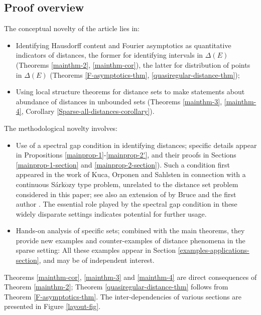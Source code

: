 \documentclass[a4paper,11pt]{amsart}
\numberwithin{equation}{section}
\begin{document}
\subsection{Proof overview} 
The conceptual novelty of the article lies in: 
\begin{itemize}
\vskip0.05in
\item Identifying Hausdorff content and Fourier asymptotics as quantitative indicators of distances, the former for identifying intervals in $\Delta(E)$ (Theorems \ref{mainthm-2}, \ref{mainthm-cor}), the latter for distribution of points in $\Delta(E)$ (Theorems \ref{F-asymptotics-thm}, \ref{quasiregular-distance-thm});   
\vskip0.05in
\item Using local structure theorems for distance sets to make statements about abundance of distances in unbounded sets (Theorems \ref{mainthm-3}, \ref{mainthm-4}, Corollary \ref{Sparse-all-distances-corollary}). 
  \end{itemize} 
The methodological novelty involves: 
\vskip0.05in 
\begin{itemize} 
\item Use of a spectral gap condition in identifying distances; specific details appear in Propositions \ref{mainprop-1}-\ref{mainprop-2'}, and their proofs in Sections \ref{mainprop-1-section} and \ref{mainprop-2-section}). Such a condition first appeared in the work of Kuca, Orponen and Sahlsten \cite{Kuca-Orponen-Sahlsten} in connection with a continuous S\'ark$\ddot{\text{o}}$zy type problem, unrelated to the distance set problem considered in this paper; see also an extension of \cite{Kuca-Orponen-Sahlsten} by Bruce and the first author \cite{Bruce-Pramanik-2023}. The essential role played by the spectral gap condition in these widely disparate settings indicates potential for further usage.    
\vskip0.05in
\item Hands-on analysis of specific sets; combined with the main theorems, they provide new examples and counter-examples of distance phenomena in the sparse setting:  All these examples appear in Section \ref{examples-applications-section}, and may be of independent interest. 
\end{itemize} 
Theorems \ref{mainthm-cor}, \ref{mainthm-3} and \ref{mainthm-4} are direct consequences of Theorem \ref{mainthm-2}; Theorem \ref{quasiregular-distance-thm} follows from Theorem \ref{F-asymptotics-thm}. The inter-dependencies of various sections are presented in Figure \ref{layout-fig}.   
\vskip0.1in
\end{document}
